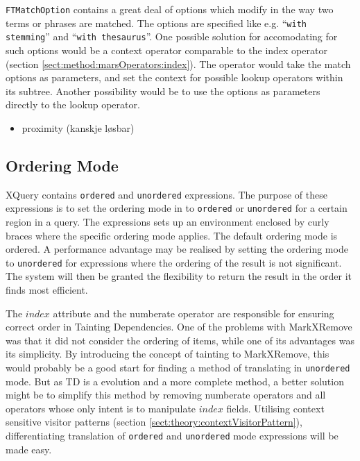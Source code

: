 \texttt{FTMatchOption} contains a great deal of options which modify in the way two terms or phrases are matched.
The options are specified like e.g. ``\texttt{with stemming}'' and ``\texttt{with thesaurus}''. One possible
solution for accomodating for such options would be a context operator comparable to the \textsf{index} operator
(section \ref{sect:method:marsOperators:index}). The operator would take the match options as parameters, and set
the context for possible \textsf{lookup} operators within its subtree. Another possibility would be to use the
options as parameters directly to the \textsf{lookup} operator.


\begin{itemize}
  	\item proximity (kanskje l\o sbar)
\end{itemize}


\subsection{Ordering Mode}

XQuery contains \texttt{ordered} and \texttt{unordered} expressions. The purpose of these expressions is to set
the ordering mode in to \texttt{ordered} or \texttt{unordered} for a certain region in a query. The expressions
sets up an environment enclosed by curly braces where the specific ordering mode applies. The default ordering
mode is ordered. A performance advantage may be realised by setting the ordering mode to \texttt{unordered} for
expressions where the ordering of the result is not significant. The system will then be granted the flexibility
to return the result in the order it finds most efficient.

The $index$ attribute and the \textsf{numberate} operator are responsible for ensuring correct order in Tainting
Dependencies. One of the problems with MarkXRemove was that it did not consider the ordering of items, while one
of its advantages was its simplicity. By introducing the concept of tainting to MarkXRemove, this would probably
be a good start for finding a method of translating in \texttt{unordered} mode. But as TD is a evolution and a
more complete method, a better solution might be to simplify this method by removing \textsf{numberate} operators
and all operators whose only intent is to manipulate $index$ fields. Utilising context sensitive visitor patterns
(section \ref{sect:theory:contextVisitorPattern}), differentiating translation of \texttt{ordered} and
\texttt{unordered} mode expressions will be made easy.


